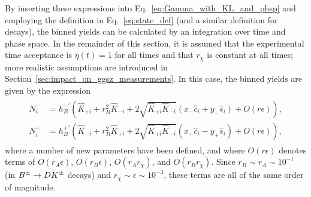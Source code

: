 By inserting these expressions into Eq.~\eqref{eq:Gamma_with_KL_and_phsp} and employing the definition in Eq.~\eqref{eq:state_def} (and a similar definition for \Bp decays), the binned yields can be calculated by an integration over time and phase space. In the remainder of this section, it is assumed that the experimental time acceptance is $\eta(t)=1$ for all times and that $r_\chi$ is constant at all times; more realistic assumptions are introduced in Section~\ref{sec:impact_on_ggsz_measurements}. In this case, the binned yields are given by the expression
\begin{align}
\begin{split}\label{eq:final_yields}
    N^-_i&= h_B^{-'} \left( \hat K_{+i} + r_B^2\hat K_{-i} + 2 \sqrt{\hat K_{+i} \hat K_{-i}}(x_- \hat c_i + y_- \hat s_i)   + O(r\epsilon) \right),
    \\
    N^+_i&= h_B^{+'} \left(\hat K_{-i} + r_B^2\hat K_{+i} + 2 \sqrt{\hat K_{+i} \hat K_{-i}}(x_+ \hat c_i - y_+ \hat s_i)   + O(r\epsilon) \right),
        \end{split}
\end{align}
where a number of new parameters have been defined, and where $O(r\epsilon)$ denotes terms of $O(r_{A}\epsilon)$, $O(r_{B}\epsilon)$, $ O(r_{A}r_\chi)$,  and $ O(r_{B}r_\chi)$. Since $r_B \sim r_A \sim 10^{-1}$ (in ${{B}^\pm}\rightarrow{\ensuremath{D}}{\ensuremath{{K}^\pm}}$ decays) and $r_\chi\sim\epsilon \sim 10^{-3}$, these terms are all of the same order of magnitude. 

